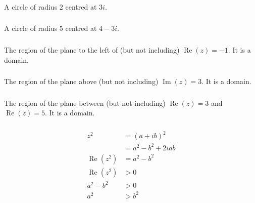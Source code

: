 \documentclass{article}
\renewcommand{\Im}{\operatorname{Im}}
\renewcommand{\Re}{\operatorname{Re}}
\begin{document}
\setcounter{subsubsection}{4}
\subsubsection{}

A circle of radius $2$ centred at $3 i$.

\setcounter{subsubsection}{6}
\subsubsection{}

A circle of radius $5$ centred at $4 - 3 i$.

\setcounter{subsubsection}{8}
\subsubsection{}

The region of the plane to the left of (but not including) $\Re (z) = -1$. It is a domain.

\setcounter{subsubsection}{10}
\subsubsection{}

The region of the plane above (but not including) $\Im (z) = 3$. It is a domain.

\setcounter{subsubsection}{12}
\subsubsection{}

The region of the plane between (but not including) $\Re (z) = 3$ and $\Re (z) = 5$. It is a domain.

\setcounter{subsubsection}{14}
\subsubsection{}

\begin{align*}
  z^2       & = (a + i b)^2         \\
            & = a^2 - b^2 + 2 i a b \\
  \Re (z^2) & = a^2 - b^2           \\
  \Re (z^2) & > 0                   \\
  a^2 - b^2 & > 0                   \\
  a^2       & > b^2
\end{align*}
\end{document}
